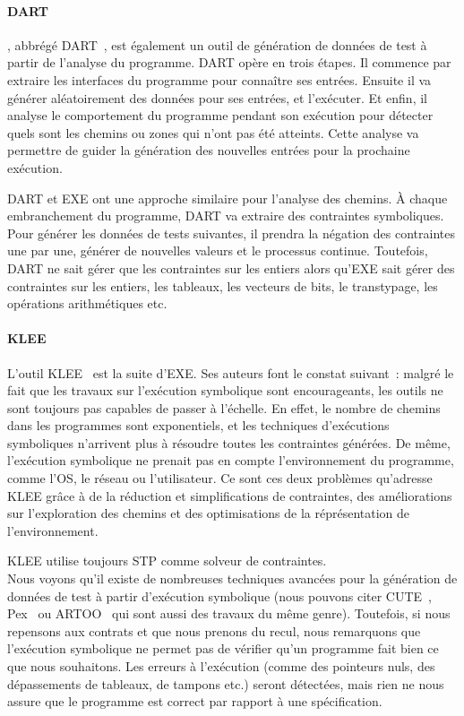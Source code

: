 \paragraph{DART} , abbrégé
DART~, est également un outil de génération de données de
test à partir de l'analyse du programme. DART opère en trois étapes. Il
commence par extraire les interfaces du programme pour connaître ses
entrées. Ensuite il va générer aléatoirement des données pour ses entrées, et
l'exécuter. Et enfin, il analyse le comportement du programme pendant son
exécution pour détecter quels sont les chemins ou zones qui n'ont pas été
atteints. Cette analyse va permettre de guider la génération des nouvelles
entrées pour la prochaine exécution.

DART et EXE ont une approche similaire pour l'analyse des chemins. À chaque
embranchement du programme, DART va extraire des contraintes symboliques. Pour
générer les données de tests suivantes, il prendra la négation des contraintes
une par une, générer de nouvelles valeurs et le processus continue. Toutefois,
DART ne sait gérer que les contraintes sur les entiers alors qu'EXE sait gérer
des contraintes sur les entiers, les tableaux, les vecteurs de bits, le
transtypage, les opérations arithmétiques etc.

\paragraph{KLEE} L'outil KLEE~ est la suite d'EXE. Ses auteurs
font le constat suivant~: malgré le fait que les travaux sur l'exécution
symbolique sont encourageants, les outils ne sont toujours pas capables de
passer à l'échelle. En effet, le nombre de chemins dans les programmes sont
exponentiels, et les techniques d'exécutions symboliques n'arrivent plus à
résoudre toutes les contraintes générées. De même, l'exécution symbolique ne
prenait pas en compte l'environnement du programme, comme l'OS, le réseau ou
l'utilisateur. Ce sont ces deux problèmes qu'adresse KLEE grâce à de la
réduction et simplifications de contraintes, des améliorations sur l'exploration
des chemins et des optimisations de la réprésentation de l'environnement.

KLEE utilise toujours STP comme solveur de contraintes. \\

Nous voyons qu'il existe de nombreuses techniques avancées pour la génération de
données de test à partir d'exécution symbolique (nous pouvons citer
CUTE~, Pex~ ou ARTOO~ qui
sont aussi des travaux du même genre). Toutefois, si nous repensons aux contrats
et que nous prenons du recul, nous remarquons que l'exécution symbolique ne
permet pas de vérifier qu'un programme fait bien ce que nous souhaitons. Les
erreurs à l'exécution (comme des pointeurs nuls, des dépassements de tableaux,
de tampons etc.) seront détectées, mais rien ne nous assure que le programme est
correct par rapport à une spécification.

